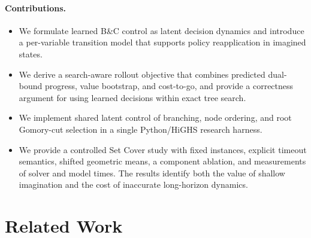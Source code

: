 \documentclass{article}
\newcommand{\BnC}{B\&C}
\begin{document}
\paragraph{Contributions.}
\begin{itemize}
  \item We formulate learned \BnC{} control as latent decision dynamics and introduce a per-variable transition model that supports policy reapplication in imagined states.
  \item We derive a search-aware rollout objective that combines predicted dual-bound progress, value bootstrap, and cost-to-go, and provide a correctness argument for using learned decisions within exact tree search.   \item We implement shared latent control of branching, node ordering, and root Gomory-cut selection in a single Python/HiGHS research harness. 
  \item We provide a controlled Set Cover study with fixed instances, explicit timeout semantics, shifted geometric means, a component ablation, and measurements of solver and model times. The results identify both the value of shallow imagination and the cost of inaccurate long-horizon dynamics.
\end{itemize}

\section{Related Work}

\end{document}
